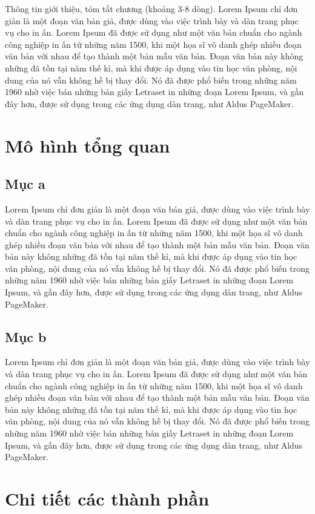 Thông tin giới thiệu, tóm tắt chương (khoảng 3-8 dòng). Lorem Ipsum chỉ đơn giản là một đoạn văn bản giả, được dùng vào việc trình bày và dàn trang phục vụ cho in ấn. Lorem Ipsum đã được sử dụng như một văn bản chuẩn cho ngành công nghiệp in ấn từ những năm 1500, khi một họa sĩ vô danh ghép nhiều đoạn văn bản với nhau để tạo thành một bản mẫu văn bản. Đoạn văn bản này không những đã tồn tại năm thế kỉ, mà khi được áp dụng vào tin học văn phòng, nội dung của nó vẫn không hề bị thay đổi. Nó đã được phổ biến trong những năm 1960 nhờ việc bán những bản giấy Letraset in những đoạn Lorem Ipsum, và gần đây hơn, được sử dụng trong các ứng dụng dàn trang, như Aldus PageMaker.

\section{Mô hình tổng quan}
\subsection{Mục a}
Lorem Ipsum chỉ đơn giản là một đoạn văn bản giả, được dùng vào việc trình bày và dàn trang phục vụ cho in ấn. Lorem Ipsum đã được sử dụng như một văn bản chuẩn cho ngành công nghiệp in ấn từ những năm 1500, khi một họa sĩ vô danh ghép nhiều đoạn văn bản với nhau để tạo thành một bản mẫu văn bản. Đoạn văn bản này không những đã tồn tại năm thế kỉ, mà khi được áp dụng vào tin học văn phòng, nội dung của nó vẫn không hề bị thay đổi. Nó đã được phổ biến trong những năm 1960 nhờ việc bán những bản giấy Letraset in những đoạn Lorem Ipsum, và gần đây hơn, được sử dụng trong các ứng dụng dàn trang, như Aldus PageMaker.

\subsection{Mục b}
Lorem Ipsum chỉ đơn giản là một đoạn văn bản giả, được dùng vào việc trình bày và dàn trang phục vụ cho in ấn. Lorem Ipsum đã được sử dụng như một văn bản chuẩn cho ngành công nghiệp in ấn từ những năm 1500, khi một họa sĩ vô danh ghép nhiều đoạn văn bản với nhau để tạo thành một bản mẫu văn bản. Đoạn văn bản này không những đã tồn tại năm thế kỉ, mà khi được áp dụng vào tin học văn phòng, nội dung của nó vẫn không hề bị thay đổi. Nó đã được phổ biến trong những năm 1960 nhờ việc bán những bản giấy Letraset in những đoạn Lorem Ipsum, và gần đây hơn, được sử dụng trong các ứng dụng dàn trang, như Aldus PageMaker.


\section{Chi tiết các thành phần}
